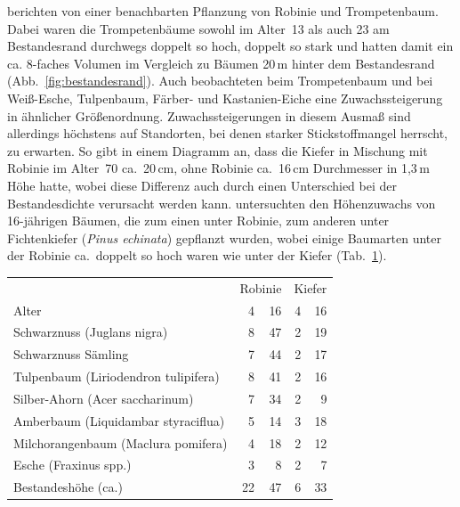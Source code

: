 \documentclass[twocolumn]{scrartcl}
\begin{document}
\citet{ferguson1922robinie,mcintyre1932robinie,chapman1935robinie}
berichten von einer benachbarten Pflanzung von Robinie und
Trompetenbaum. Dabei waren die Trompetenbäume sowohl im Alter~13 als
auch 23 am Bestandesrand durchwegs doppelt so hoch, doppelt so stark
und hatten damit ein ca. 8-faches Volumen im Vergleich zu Bäumen 20\,m
hinter dem Bestandesrand (Abb.~\ref{fig:bestandesrand}). Auch
\citet{mcintyre1932robinie} beobachteten beim Trompetenbaum und
\citet{chapman1935robinie} bei Weiß-Esche, Tulpenbaum, Färber- und
Kastanien-Eiche eine Zuwachssteigerung in ähnlicher
Größenordnung. Zuwachssteigerungen in diesem Ausmaß sind allerdings
höchstens auf Standorten, bei denen starker Stickstoffmangel herrscht,
zu erwarten. So gibt \citet[S.~107]{krauss1986sauenerWald} in einem
Diagramm an, dass die Kiefer in Mischung mit Robinie im Alter~70
ca.\ 20\,cm, ohne Robinie ca.\ 16\,cm Durchmesser in 1,3\,m Höhe
hatte, wobei diese Differenz auch durch einen Unterschied bei der
Bestandesdichte verursacht werden
kann. \citet{ashby1986robinieWuchssteigerung} untersuchten den
Höhenzuwachs von 16-jährigen Bäumen, die zum einen unter Robinie, zum
anderen unter Fichtenkiefer (\emph{Pinus echinata}) gepflanzt wurden,
wobei einige Baumarten unter der Robinie ca.\ doppelt so hoch waren
wie unter der Kiefer (Tab.~\ref{tab:zuwachsUnterbau}).

\begin{table}[htbp]
  \centering
  \begin{tabular}{lrr|rr}
    & \multicolumn{2}{c|}{Robinie} & \multicolumn{2}{c}{Kiefer} \\
    Alter & 4 & 16 & 4 & 16\\
    \hline
    Schwarznuss (Juglans nigra)          &  8 & 47 & 2 & 19 \\
    Schwarznuss Sämling                  &  7 & 44 & 2 & 17 \\
    Tulpenbaum (Liriodendron tulipifera) &  8 & 41 & 2 & 16 \\
    Silber-Ahorn (Acer saccharinum)      &  7 & 34 & 2 & 9 \\
    Amberbaum (Liquidambar styraciflua)  &  5 & 14 & 3 & 18 \\
    Milchorangenbaum (Maclura pomifera)  &  4 & 18 & 2 & 12 \\
    Esche (Fraxinus spp.)                &  3 &  8 & 2 & 7 \\
    Bestandeshöhe (ca.)                  & 22 & 47 & 6 & 33 \\
  \end{tabular}%
  \label{tab:zuwachsUnterbau}
\end{table}
\end{document}
